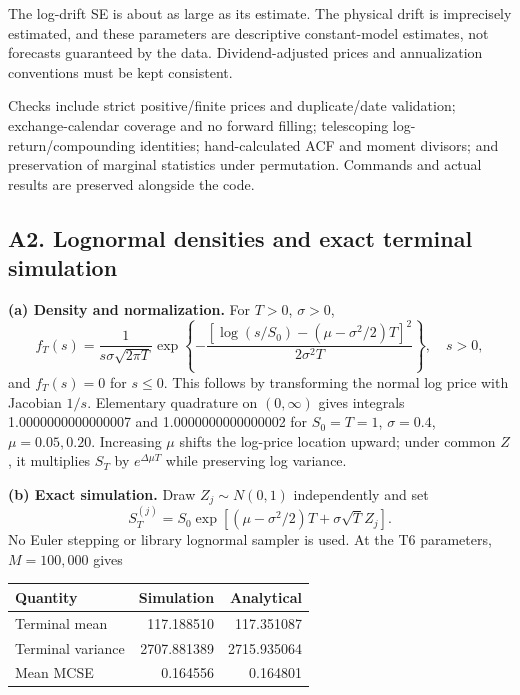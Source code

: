 The log-drift SE is about as large as its estimate. The physical drift is imprecisely estimated, and these parameters are descriptive constant-model estimates, not forecasts guaranteed by the data. Dividend-adjusted prices and annualization conventions must be kept consistent.

Checks include strict positive/finite prices and duplicate/date validation; exchange-calendar coverage and no forward filling; telescoping log-return/compounding identities; hand-calculated ACF and moment divisors; and preservation of marginal statistics under permutation. Commands and actual results are preserved alongside the code.
\clearpage
{}
\clearpage
{}
\clearpage
\subsection{A2. Lognormal densities and exact terminal simulation}
\textbf{(a) Density and normalization.} For $T>0$, $\sigma>0$,
\[
 f_T(s)=\frac{1}{s\sigma\sqrt{2\pi T}}
 \exp\left\{-\frac{[\log(s/S_0)-(\mu-\sigma^2/2)T]^2}{2\sigma^2T}\right\},\quad s>0,
\]
and $f_T(s)=0$ for $s\leq0$. This follows by transforming the normal log price with Jacobian $1/s$. Elementary quadrature on $(0,\infty)$ gives integrals 1.0000000000000007 and 1.0000000000000002 for $S_0=T=1$, $\sigma=0.4$, $\mu=0.05,0.20$. Increasing $\mu$ shifts the log-price location upward; under common $Z$, it multiplies $S_T$ by $e^{\Delta\mu T}$ while preserving log variance.

\textbf{(b) Exact simulation.} Draw $Z_j\sim N(0,1)$ independently and set
\[
 S_T^{(j)}=S_0\exp[(\mu-\sigma^2/2)T+\sigma\sqrt{T}Z_j].
\]
No Euler stepping or library lognormal sampler is used. At the T6 parameters, $M=100{,}000$ gives
\begin{center}
\begin{tabular}{lrr}
\toprule
Quantity & Simulation & Analytical\\\midrule
Terminal mean & 117.188510 & 117.351087\\
Terminal variance & 2707.881389 & 2715.935064\\
Mean MCSE & 0.164556 & 0.164801\\
\bottomrule
\end{tabular}
\end{center}

